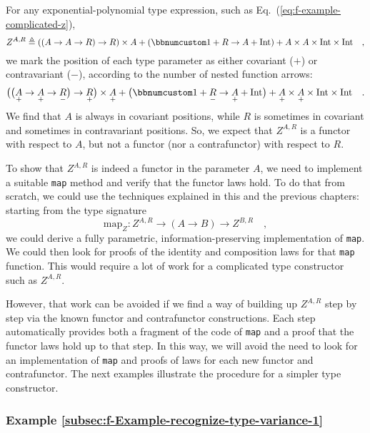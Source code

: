 For any exponential-polynomial type expression, such as Eq.~(\ref{eq:f-example-complicated-z}),
\[
Z^{A,R}\triangleq\left(\left(A\rightarrow A\rightarrow R\right)\rightarrow R\right)\times A+\left(\bbnum 1+R\rightarrow A+\text{Int}\right)+A\times A\times\text{Int}\times\text{Int}\quad,
\]
we mark the position of each type parameter as either covariant ($+$)
or contravariant ($-$), according to the number of nested function
arrows:
\[
\big(\big(\underset{+}{A}\rightarrow\underset{+}{A}\rightarrow\underset{-}{R}\big)\rightarrow\underset{+}{R}\big)\times\underset{+}{A}+\big(\bbnum 1+\underset{-}{R}\rightarrow\underset{+}{A}+\text{Int}\big)+\underset{+}{A}\times\underset{+}{A}\times\text{Int}\times\text{Int}\quad.
\]
We find that $A$ is always in covariant positions, while $R$ is
sometimes in covariant and sometimes in contravariant positions. So,
we expect that $Z^{A,R}$ is a functor with respect to $A$, but not
a functor (nor a contrafunctor) with respect to $R$.

To show that $Z^{A,R}$ is indeed a functor in the parameter $A$,
we need to implement a suitable \lstinline!map! method and verify
that the functor laws hold. To do that from scratch, we could use
the techniques explained in this and the previous chapters: starting
from the type signature 
\[
\text{map}_{Z}:Z^{A,R}\rightarrow\left(A\rightarrow B\right)\rightarrow Z^{B,R}\quad,
\]
we could derive a fully parametric, information-preserving implementation
of \lstinline!map!. We could then look for proofs of the identity
and composition laws for that \lstinline!map! function. This would
require a lot of work for a complicated type constructor such as $Z^{A,R}$.

However, that work can be avoided if we find a way of building up
$Z^{A,R}$ step by step via the known functor and contrafunctor constructions.
Each step automatically provides both a fragment of the code of \lstinline!map!
and a proof that the functor laws hold up to that step. In this way,
we will avoid the need to look for an implementation of \lstinline!map!
and proofs of laws for each new functor and contrafunctor. The next
examples illustrate the procedure for a simpler type constructor.

\subsubsection{Example \label{subsec:f-Example-recognize-type-variance-1}\ref{subsec:f-Example-recognize-type-variance-1}}

